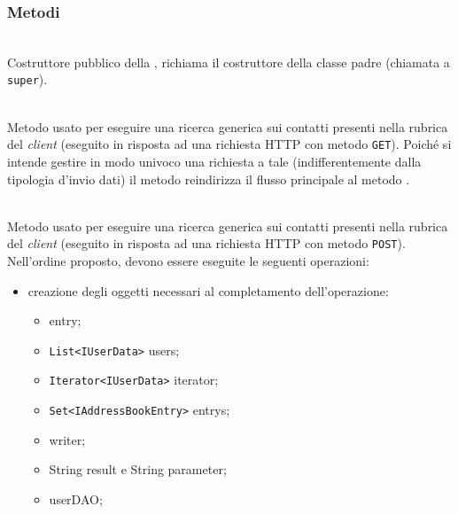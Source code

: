 \subsubsection*{Metodi}

\begin{description}
	\item{}\\
	Costruttore pubblico della , richiama il costruttore della classe padre (chiamata a \texttt{super}).
	
	\item{}\\
	Metodo usato per eseguire una ricerca generica sui contatti presenti nella rubrica del \textit{client} (eseguito in risposta ad una richiesta HTTP con metodo \texttt{GET}). Poiché si intende gestire in modo univoco una richiesta a tale  (indifferentemente dalla tipologia d'invio dati) il metodo reindirizza il flusso principale al metodo .
	
	\item{}\\	
	Metodo usato per eseguire una ricerca generica sui contatti presenti nella rubrica del \textit{client} (eseguito in risposta ad una richiesta HTTP con metodo \texttt{POST}). Nell'ordine proposto, devono essere eseguite le seguenti operazioni:
	\begin{itemize}
		\item creazione degli oggetti necessari al completamento dell'operazione:
		\begin{itemize}
			\item {} entry;
			\item \texttt{List<IUserData>} users;
			\item \texttt{Iterator<IUserData>} iterator;
			\item \texttt{Set<IAddressBookEntry>} entrys;
			\item {} writer;
			\item String result e String parameter;
			\item {} userDAO;
		\end{itemize}
		

\end{itemize}
\end{description}
